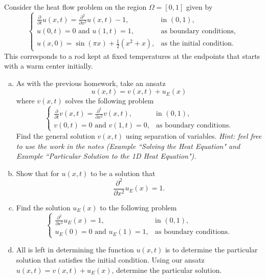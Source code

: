 \documentclass[12pt]{article} %
\begin{document}
\begin{problem}
Consider the heat flow problem on the region $\Omega=[0,1]$ given by
\[
\begin{cases}
\frac{\partial}{\partial t} u(x,t) = \frac{\partial^2}{\partial x^2} u(x,t) - 1, & \textrm{in $(0,1)$},\\
u(0,t)=0 \textrm{~and~} u(1,t)=1, & \text{as boundary conditions},\\
u(x,0) = \sin\left(\pi x\right) + \frac{1}{2}(x^2+x), & \textrm{as the initial condition}.
\end{cases}
\]
This corresponds to a rod kept at fixed temperatures at the endpoints that starts with a warm center initially.
\begin{enumerate}[(a)]
    \item As with the previous homework, take an ansatz
    \[
    u(x,t) = v(x,t) + u_E(x)
    \]
    where $v(x,t)$ solves the following problem
    \[
\begin{cases}
\frac{\partial}{\partial t} v(x,t) = \frac{\partial^2}{\partial x^2} v(x,t), & \textrm{in $(0,1)$},\\
v(0,t)=0 \textrm{~and~} v(1,t)=0, & \text{as boundary conditions}.
\end{cases}
    \]
    Find the general solution $v(x,t)$ using separation of variables. \emph{Hint: feel free to use the work in the notes (Example ``Solving the Heat Equation" and Example ``Particular Solution to the 1D Heat Equation").}

    \item Show that for $u(x,t)$ to be a solution that
    \[
    \frac{\partial^2}{\partial x^2} u_E(x) = 1.
    \]

    \item Find the solution $u_E(x)$ to the following problem
    \[
    \begin{cases}
    \frac{\partial^2}{\partial x^2} u_E(x) = 1, & \textrm{in $(0,1)$},\\
    u_E(0)=0 \textrm{~and~} u_E(1)=1, & \text{as boundary conditions}.
    \end{cases}
    \]
    
    \item All is left in determining the function $u(x,t)$ is to determine the particular solution that satisfies the initial condition. Using our ansatz $u(x,t)=v(x,t)+u_E(x)$, determine the particular solution.
\end{enumerate}
\end{problem}
\end{document}
